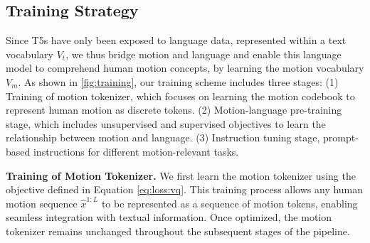 \subsection{Training Strategy}
\label{sec:method: strategy}
Since T5s have only been exposed to language data, represented within a text vocabulary $V_t$, we thus bridge motion and language and enable this language model to comprehend human motion concepts, by learning the motion vocabulary $V_m$. As shown in \cref{fig:training}, our training scheme includes three stages: (1) Training of motion tokenizer, which focuses on learning the motion codebook to represent human motion as discrete tokens. (2) Motion-language pre-training stage, which includes unsupervised and supervised objectives to learn the relationship between motion and language. (3) Instruction tuning stage,  prompt-based instructions for different motion-relevant tasks.

\textbf{Training of Motion Tokenizer.} We first learn the motion tokenizer using the objective defined in Equation \ref{eq:loss:vq}. This training process allows any human motion sequence $\hat{x}^{1:L}$ to be represented as a sequence of motion tokens, enabling seamless integration with textual information. Once optimized, the motion tokenizer remains unchanged throughout the subsequent stages of the pipeline.

